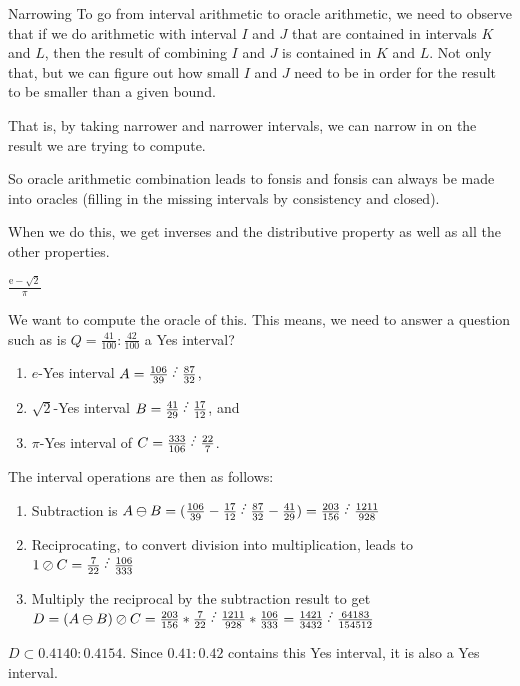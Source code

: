 \documentclass{beamer}
\begin{document}
\begin{frame}{Narrowing}
    To go from interval arithmetic to oracle arithmetic, we need to observe that if we do arithmetic with interval $I$ and $J$ that are contained in intervals $K$ and $L$,  then the result of combining $I$ and $J$ is contained in $K$ and $L$. Not only that, but we can figure out how small $I$ and $J$ need to be in order for the result to be smaller than a given bound. 

    That is, by taking narrower and narrower intervals, we can narrow in on the result we are trying to compute. 

    So oracle arithmetic combination leads to fonsis and fonsis can always be made into oracles (filling in the missing intervals by consistency and closed). 

    When we do this, we get inverses and the distributive property as well as all the other properties. 
    
\end{frame}

\begin{frame}{$\frac{\mathrm{e} - \sqrt{2}}{\pi}$}

    We want to compute the oracle of this. This means, we need to answer a question such as is $Q = \frac{41}{100}: \frac{42}{100}$ a Yes interval?

\begin{enumerate}
\item $e$-Yes interval $A  = \frac{106}{39} \lte \frac{87}{32}$,
\item $\sqrt{2}$-Yes interval $B = \frac{41}{29} \lte \frac{17}{12}$, and
\item $\pi$-Yes interval of $C= \frac{333}{106} \lte \frac{22}{7}$.
\end{enumerate}
The interval operations are then as follows:
\begin{enumerate}
\item Subtraction is $A\ominus B = (\frac{106}{39} - \frac{17}{12} \lte \frac{87}{32} - \frac{41}{29}) = \frac{203}{156} \lte \frac{1211}{928}$ 
\item Reciprocating, to convert division into multiplication, leads to  $1\oslash C = \frac{7}{22} \lte \frac{106}{333}$
\item Multiply the reciprocal by the subtraction result to get $D = (A\ominus B)\oslash C = \frac{203}{156} *\frac{7}{22} \lte \frac{1211}{928} * \frac{106}{333} = \frac{1421}{3432} \lte \frac{64183}{154512}$
\end{enumerate}

$D \subset 0.4140: 0.4154$. Since $0.41:0.42$ contains this Yes interval, it is also a Yes interval.  
    
\end{frame}
\end{document}
